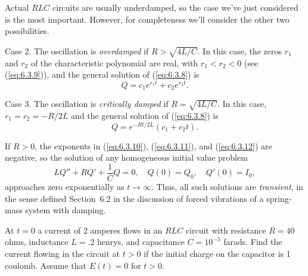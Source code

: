 Actual $RLC$ circuits are usually underdamped, so the case we've just considered is the most
important. However, for completeness we'll consider the other two possibilities.

{\sc Case 2.} The oscillation is {\color{blue}\it overdamped\/} if $R>\sqrt{4L/C}$. In this case,
the zeros $r_{1}$ and $r_{2}$ of the characteristic polynomial are real, with $r_{1}<r_{2}<0$ (see
(\ref{eq:6.3.9})), and the general solution of (\ref{eq:6.3.8}) is
\begin{equation}
  \label{eq:6.3.11}Q=c_{1}e^{r_{1}t}+c_{2}e^{r_{2}t}.
\end{equation}

{\sc Case 3.} The oscillation is {\color{blue}\it critically damped\/} if $R=\sqrt{4L/C}$. In this
case, $r_{1}=r_{2}=-R/2L$ and the general solution of (\ref{eq:6.3.8}) is
\begin{equation}
  \label{eq:6.3.12}Q=e^{-Rt/2L}(c_{1}+c_{2}t).
\end{equation}

If $R>0$, the exponents in (\ref{eq:6.3.10}), (\ref{eq:6.3.11}), and (\ref{eq:6.3.12}) are
negative, so the solution of any homogeneous initial value problem
\[
  LQ''+RQ'+\frac{1}{C}Q=0,\quad Q(0)=Q_{0},\quad Q'(0)=I_{0},
\]
approaches zero exponentially as $t\to\infty$. Thus, all such solutions are {\color{blue}\it
transient\/}, in the sense defined Section~6.2 in the discussion of forced vibrations of a
spring-mass system with damping.

\begin{example}
  \label{example:6.3.1} \rm At $t=0$ a current of 2 amperes flows in an $RLC$ circuit with
  resistance $R=40$ ohms, inductance $L=.2$ henrys, and capacitance $C=10^{-5}$ farads. Find the
  current flowing in the circuit at $t>0$ if the initial charge on the capacitor is 1 coulomb.
  Assume that $E(t)=0$ for $t>0$.
\end{example}

